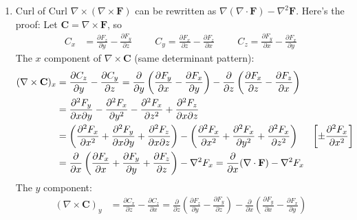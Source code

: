 \begin{enumerate}
\begin{align*}
        &= 0 + 0 + 0 = 0 \hspace{1cm} \text{[mixed partials commute]}
      \end{align*}
  \item Curl of Curl \(\nabla \times (\nabla \times \mathbf{F})\) can be rewritten as
    \( \nabla(\nabla \cdot \mathbf{F}) - \nabla^2 \mathbf{F}\). Here's the proof:
    Let \(\mathbf{C} = \nabla \times \mathbf{F}\), so
    \begin{align*}
      C_x &= \frac{\partial F_z}{\partial y} - \frac{\partial F_y}{\partial z} \hspace{1cm}
      C_y = \frac{\partial F_x}{\partial z} - \frac{\partial F_z}{\partial x} \hspace{1cm}
      C_z = \frac{\partial F_y}{\partial x} - \frac{\partial F_x}{\partial y}
    \end{align*}
    The \(x\) component of \(\nabla \times \mathbf{C}\) (same determinant pattern):
    \begin{align*}
      (\nabla \times \mathbf{C})_x &= \frac{\partial C_z}{\partial y} - \frac{\partial C_y}{\partial z}
        = \frac{\partial}{\partial y}\left(\frac{\partial F_y}{\partial x} - \frac{\partial F_x}{\partial y}\right) - \frac{\partial}{\partial z}\left(\frac{\partial F_x}{\partial z} - \frac{\partial F_z}{\partial x}\right) \\
      &= \frac{\partial^2 F_y}{\partial x \partial y} - \frac{\partial^2 F_x}{\partial y^2} - \frac{\partial^2 F_x}{\partial z^2} + \frac{\partial^2 F_z}{\partial x \partial z} \\
      &= \left(\frac{\partial^2 F_x}{\partial x^2} + \frac{\partial^2 F_y}{\partial x \partial y} + \frac{\partial^2 F_z}{\partial x \partial z}\right) - \left(\frac{\partial^2 F_x}{\partial x^2} + \frac{\partial^2 F_x}{\partial y^2} + \frac{\partial^2 F_x}{\partial z^2}\right) \hspace{0.5cm} \left[\pm\frac{\partial^2 F_x}{\partial x^2}\right] \\
      &= \frac{\partial}{\partial x}\left(\frac{\partial F_x}{\partial x} + \frac{\partial F_y}{\partial y} + \frac{\partial F_z}{\partial z}\right) - \nabla^2 F_x
        = \frac{\partial}{\partial x}(\nabla \cdot \mathbf{F}) - \nabla^2 F_x
    \end{align*}
    The \(y\) component:
    \begin{align*}
      (\nabla \times \mathbf{C})_y &= \frac{\partial C_x}{\partial z} - \frac{\partial C_z}{\partial x}
        = \frac{\partial}{\partial z}\left(\frac{\partial F_z}{\partial y} - \frac{\partial F_y}{\partial z}\right) - \frac{\partial}{\partial x}\left(\frac{\partial F_y}{\partial x} - \frac{\partial F_x}{\partial y}\right) \\

\end{align*}
\end{enumerate}
